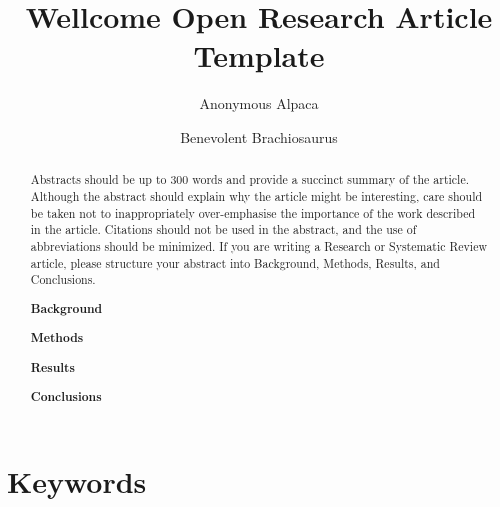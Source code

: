 \documentclass[10pt,a4paper,twocolumn]{article}
\begin{document}
\title{Wellcome Open Research Article Template}


\author[1, 2, 3]{Anonymous Alpaca}
\author[2]{Benevolent Brachiosaurus}


\maketitle
\thispagestyle{fancy}




\begin{abstract}

Abstracts should be up to 300 words and provide a succinct summary of the article. Although the abstract should explain why the article might be interesting, care should be taken not to inappropriately over-emphasise the importance of the work described in the article. Citations should not be used in the abstract, and the use of abbreviations should be minimized. If you are writing a Research or Systematic Review article, please structure your abstract into Background, Methods, Results, and Conclusions.

\textbf{Background}

\textbf{Methods}

\textbf{Results}

\textbf{Conclusions}



\end{abstract}

\section*{Keywords}
\end{document}
